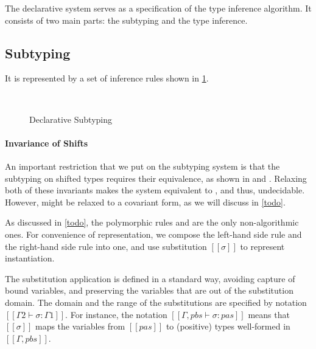 
The declarative system serves as a specification of the
type inference algorithm. It consists of two main parts:
the subtyping and the type inference. 

\subsection{Subtyping}
It is represented by a set of inference rules shown in
\cref{fig:declarative-subtyping}.

\begin{figure}[h]
  \begin{multicols}{2}
    \ottdefnDOneNsub{}

    \ottdefnDOnePsup{}
  \end{multicols}
  \hfill\\
  \begin{multicols}{2}
    \ottdefnDOneNeq{}

    \ottdefnDOnePeq{}
  \end{multicols}
  \caption{Declarative Subtyping}
  \label{fig:declarative-subtyping}
\end{figure}

\paragraph{Invariance of Shifts}
An important restriction that we put on the subtyping system is
that the subtyping on shifted types requires their equivalence,
as shown in  and
. Relaxing both of these
invariants makes the system equivalent to \systemf, 
and thus, undecidable. 
However,  might be
relaxed to a covariant form, as we will discuss in \cref{todo}.

As discussed in \cref{todo}, 
the polymorphic rules  and 
 are the only non-algorithmic ones.
For convenience of representation, we compose the left-hand side rule and
the right-hand side rule into one, and use substitution $[[σ]]$ to 
represent instantiation.  

The substitution application is defined 
in a standard way, avoiding capture of bound variables,
and preserving the variables that are out of the substitution domain.
The domain and the range of the substitutions are
specified by notation $[[Γ2 ⊢ σ : Γ1]]$.
For instance, the notation $[[Γ, pbs ⊢ σ : {pas}]]$ means that 
$[[σ]]$ maps the variables from $[[pas]]$ to (positive) types
well-formed in $[[Γ, pbs]]$.

